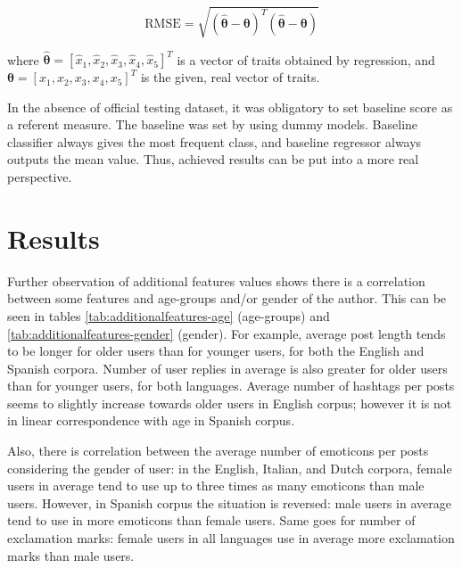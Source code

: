 \documentclass[10pt, a4paper]{article}
\newcommand{\vect}[1]{\boldsymbol{#1}}
\begin{document}
\[\mathrm{RMSE}=\sqrt{\left(\hat{\vect{\theta}} - \vect{\theta}\right)^{T} \left(\hat{\vect{\theta}} - \vect{\theta}\right)} \]

\noindent where $\hat{\vect{\theta}} = \left[\hat{x}_1, \hat{x}_2, \hat{x}_3, \hat{x}_4, \hat{x}_5\right]^{T}$ is a vector of traits obtained by regression, and $\vect{\theta} = \left[x_1, x_2, x_3, x_4, x_5\right]^{T}$ is the given, real vector of traits.

In the absence of official testing dataset, it was obligatory to set baseline score as a referent measure.
The baseline was set by using dummy models.
Baseline classifier always gives the most frequent class, and baseline regressor always outputs the mean value.
Thus, achieved results can be put into a more real perspective.

\section{Results}
\label{sec:results}

Further observation of additional features values shows there is a correlation between some features and age-groups and/or gender of the author.
This can be seen in tables \ref{tab:additionalfeatures-age} (age-groups) and \ref{tab:additionalfeatures-gender} (gender).
For example, average post length tends to be longer for older users than for younger users, for both the English and Spanish corpora.
Number of user replies in average is also greater for older users than for younger users, for both languages.
Average number of hashtags per posts seems to slightly increase towards older users in English corpus; however it is not in linear correspondence with age in Spanish corpus.

Also, there is correlation between the average number of emoticons per posts considering the gender of user: in the English, Italian, and Dutch corpora, female users in average tend to use up to three times as many emoticons than male users.
However, in Spanish corpus the situation is reversed: male users in average tend to use in more emoticons than female users.
Same goes for number of exclamation marks: female users in all languages use in average more exclamation marks than male users.

\end{document}
